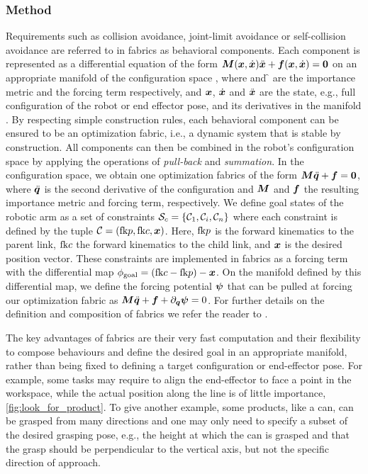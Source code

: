 \subsubsection{Method}
Requirements such as collision avoidance, joint-limit avoidance or self-collision avoidance are referred to in fabrics as behavioral components. Each component is represented as a differential equation of the form
$\bm{M}(\bm{x},\dot{\bm{x}})\ddot{\bm{x}}+\bm{f}(\bm{x},\dot{\bm{x}})=\bm{0}$ on an appropriate
manifold \X{} of the configuration space \Q{}, where \M{} and \f{} are the importance metric and the forcing term respectively, and $\bm{x}$, $\dot{\bm{x}}$ and $\ddot{\bm{x}}$ are the state, e.g., full configuration of the robot or end effector pose, and its derivatives in the manifold \X{}.
By respecting
simple construction rules, each behavioral component can be ensured to
be an optimization fabric, i.e., a dynamic system that is
stable by construction. All components can then be combined
in the robot's configuration space by applying the
operations of \textit{pull-back} and \textit{summation}. In
the configuration space, we obtain one optimization fabrics
of the form $\bm{M}\ddot{\bm{q}} + \bm{f} = \bm{0}$, where $\ddot{\bm{q}}$ is the second derivative of the configuration and $\bm{M}$ and $\bm{f}$ the resulting importance metric and forcing term, respectively.
We define goal states of the robotic arm as a set of
constraints $\mathcal{S}_c = \{\mathcal{C}_1,\mathcal{C}_i,\mathcal{C}_n\}$ where each
constraint \Con{} is defined by the tuple
$\mathcal{C}=(\textrm{fk}{p},\textrm{fk}{c},\bm{x})$. Here, $\textrm{fk}{p}$ is the forward
kinematics to the parent link, $\textrm{fk}{c}$ the forward
kinematics to the child link, and $\bm{x}$ is the desired position
vector. These constraints are implemented in \ac{fabrics} as a forcing term with the
differential map $\phi_{\textrm{goal}} = (\textrm{fk}{c} - \textrm{fk}{p}) -
\bm{x}$. On the manifold defined by this differential map, we
define the forcing potential $\bm{\psi}$ that can be pulled at
forcing our optimization fabric as
$\bm{M}\ddot{\bm{q}}+\bm{f}+\partial_{\bm{q}}\bm{\psi} = 0$.
For further details on the definition and composition of fabrics we refer the reader to \cite{spahn2023}.

The key advantages of \ac{fabrics} are their very fast computation and their flexibility to
compose behaviours and define the desired goal in an appropriate manifold, rather than being
fixed to defining a target configuration or end-effector pose. For
example, some tasks may require to align the end-effector
to face a point in the workspace, while
the actual position along the line is of little importance,
\cref{fig:look_for_product}.
To give another example, some products, like a can, can be grasped from many directions and one may only need to specify a subset of the desired grasping pose, e.g., the height at which the can is grasped and that the grasp should be perpendicular to the vertical axis, but not the specific direction of approach.


